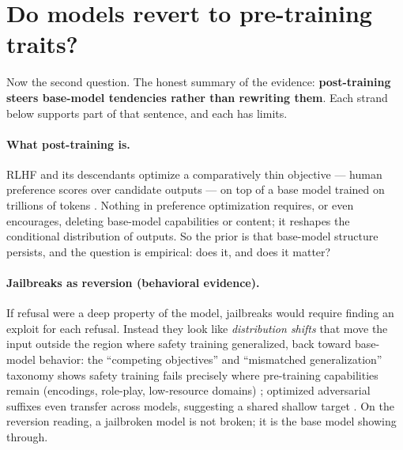 \documentclass[11pt]{article}
\begin{document}
\section{Do models revert to pre-training traits?}
\label{sec:reversion}
Now the second question. The honest summary of the evidence: \textbf{post-training steers base-model tendencies rather than rewriting them}. Each strand below supports part of that sentence, and each has limits.

\paragraph{What post-training is.} RLHF and its descendants optimize a comparatively thin objective --- human preference scores over candidate outputs --- on top of a base model trained on trillions of tokens \cite{ouyang2022training}. Nothing in preference optimization requires, or even encourages, deleting base-model capabilities or content; it reshapes the conditional distribution of outputs. So the prior is that base-model structure persists, and the question is empirical: does it, and does it matter?

\paragraph{Jailbreaks as reversion (behavioral evidence).} If refusal were a deep property of the model, jailbreaks would require finding an exploit for each refusal. Instead they look like \emph{distribution shifts} that move the input outside the region where safety training generalized, back toward base-model behavior: the ``competing objectives'' and ``mismatched generalization'' taxonomy shows safety training fails precisely where pre-training capabilities remain (encodings, role-play, low-resource domains) \cite{wei2023jailbroken}; optimized adversarial suffixes even transfer across models, suggesting a shared shallow target \cite{zou2023universal}. On the reversion reading, a jailbroken model is not broken; it is the base model showing through.
\end{document}
